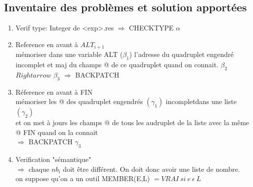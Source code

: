 \documentclass[10pt,a4paper]{article}
\begin{document}
\subsection*{Inventaire des problèmes et solution apportées}
\begin{enumerate}
    \item Verif type: Integer de <exp>.res $\Rightarrow$ CHECKTYPE $\alpha$
    \item Reference en avant à $ALT_{i+1}$ \\
        mémoriser dans une variable ALT ($\beta_1$) l'adresse du quadruplet engendré\\
        incomplet et maj du champs @ de ce quadruplet quand on connait. $\beta_2$\\
        $Rightarrow$ $\beta_3$ $\Rightarrow$ BACKPATCH
    \item Réference en avant à FIN\\
        mémoriser les @ des quadruplet engendrés $(\gamma_1)$ incompletdans une liste $(\gamma_2)$\\
        et on met à jours les champs @ de tous les audruplet de la liste avec la même @ FIN quand on la connait\\
        $\Rightarrow $ BACKPATCH $\gamma_3$
        \item Verification "sémantique"\\
            $\Rightarrow$ chaque $nb_i$ doit être différent. On doit donc avoir une liste de nombre.\\
            on suppose qu'on a un outil MEMBER(E,L) $= VRAI\ si\ e\ \epsilon\ L$ 

\end{enumerate}
\end{document}
